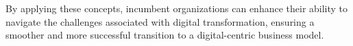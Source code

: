 \documentclass[a4]{scrartcl}
\begin{document}
By applying these concepts, incumbent organizations can enhance their ability to navigate the challenges associated with digital transformation, ensuring a smoother and more successful transition to a digital-centric business model.










	
\newpage
{}
\begin{spacing}{0.9}
	\printbibliography
\end{spacing}


	
	
	
	
	
	
\end{document}

